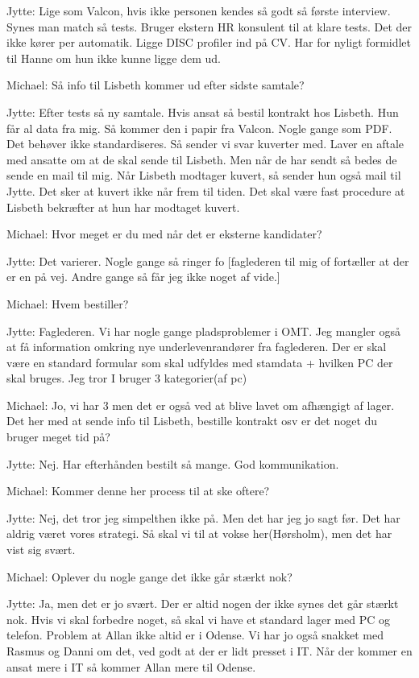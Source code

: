 \begin{linenumbers*}
Jytte:
Lige som Valcon, hvis ikke personen kendes så godt så første interview. 
Synes man match så tests. Bruger ekstern HR konsulent til at klare tests.
Det der ikke kører per automatik. Ligge DISC profiler ind på CV. 
Har for nyligt formidlet til Hanne om hun ikke kunne ligge dem ud.

Michael:
Så info til Lisbeth kommer ud efter sidste samtale?

Jytte:
Efter tests så ny samtale. Hvis ansat så bestil kontrakt hos Lisbeth.
Hun får al data fra mig.
Så kommer den i papir fra Valcon. Nogle gange som PDF.
Det behøver ikke standardiseres. 
Så sender vi svar kuverter med. Laver en aftale med ansatte
om at de skal sende til Lisbeth.
Men når de har sendt så bedes de sende en mail til mig. 
Når Lisbeth modtager kuvert, så sender hun også mail til Jytte.
Det sker at kuvert ikke når frem til tiden.
Det skal være fast procedure at Lisbeth bekræfter at hun har modtaget kuvert.

Michael:
Hvor meget er du med når det er eksterne kandidater?

Jytte:
Det varierer. Nogle gange så ringer fo
[faglederen til mig of fortæller at der er en på vej. 
Andre gange så får jeg ikke noget af vide.]

Michael:
Hvem bestiller?

Jytte:
Faglederen. Vi har nogle gange pladsproblemer i OMT.
Jeg mangler også at få information omkring nye underlevenrandører fra faglederen. 
Der er skal være en standard formular som skal udfyldes med stamdata
+ hvilken PC der skal bruges. 
Jeg tror I bruger 3 kategorier(af pc)

Michael:
Jo, vi har 3 men det er også ved at blive lavet om afhængigt af lager.
Det her med at sende info til Lisbeth,
bestille kontrakt osv er det noget du bruger meget tid på?

Jytte:
Nej. Har efterhånden bestilt så mange. God kommunikation.

Michael:
Kommer denne her process til at ske oftere?

Jytte:
Nej, det tror jeg simpelthen ikke på. Men det har jeg jo sagt før.
Det har aldrig været vores strategi.
Så skal vi til at vokse her(Hørsholm), men det har vist sig svært.

Michael:
Oplever du nogle gange det ikke går stærkt nok?

Jytte:
Ja, men det er jo svært. Der er altid nogen der ikke synes det går stærkt nok.
Hvis vi skal forbedre noget, så skal vi have et standard lager med PC og telefon.
Problem at Allan ikke altid er i Odense.
Vi har jo også snakket med Rasmus og Danni om det, ved godt at der er lidt presset i IT.
Når der kommer en ansat mere i IT så kommer Allan mere til Odense.


\end{linenumbers*}
